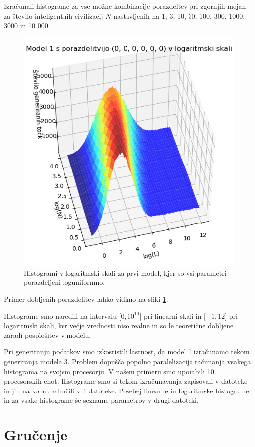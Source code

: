 \documentclass[a4paper]{IEEEtran}
\begin{document}
Izračunali histograme za vse možne kombinacije porazdeltev
pri zgornjih mejah za število inteligentnih civilizacij $N$ nastavljenih na 1, 3, 10, 30, 100, 300, 1000, 3000 in 10 000.

\begin{figure}[!h]
	\centering
	\includegraphics[width=0.7\linewidth]{Figures/porazdelitev3D}
	\caption{Histogrami v logaritmski skali za prvi model, kjer so vsi parametri porazdeljeni loguniformno.}
	\label{fig:porazdelitev3d}
\end{figure}

Primer dobljenih porazdelitev lahko vidimo na sliki \ref{fig:porazdelitev3d}.

Histograme smo naredili na intervalu $\lbrack 0, 10^10\rbrack$ pri linearni skali in $\lbrack -1, 12\rbrack$ pri logaritmski skali, ker večje vrednosti niso realne in so le teoretične dobljene zaradi posplošitev v modelu.

Pri generiranju podatkov smo izkosristili lastnost, da model 1 izračunamo tekom generiranja modela 3. Problem dopušča popolno paralelizacijo računanja vsakega histograma na svojem procesorju. V našem primeru smo uporabili 10 procesorskih enot. Histograme smo si tekom izračunavanja zapisovali v datoteke in jih na koncu združili v 4 datoteke. Posebej linearne in logaritmske histograme in za vsake histograme še sezname parametrov v drugi datoteki.

\section{Gručenje}
\end{document}
